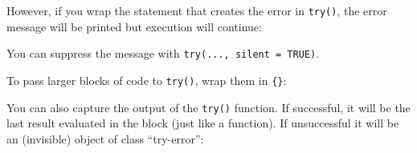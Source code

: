 \begin{Shaded}
\begin{Highlighting}[]
\StringTok{ }
\NormalTok{\}}
\NormalTok{(}\NormalTok{)}
\end{Highlighting}
\end{Shaded}

However, if you wrap the statement that creates the error in
\texttt{try()}, the error message will be printed but execution will
continue:

\begin{Shaded}
\begin{Highlighting}[]
\StringTok{ }
  \NormalTok{(}
\NormalTok{\}}
\NormalTok{(}\NormalTok{)}
\end{Highlighting}
\end{Shaded}

You can suppress the message with \texttt{try(..., silent = TRUE)}.

To pass larger blocks of code to \texttt{try()}, wrap them in
\texttt{\{\}}:

\begin{Shaded}
\begin{Highlighting}[]
\NormalTok{(\{}
  \StringTok{ }
  \StringTok{ }
\NormalTok{\})}
\end{Highlighting}
\end{Shaded}

You can also capture the output of the \texttt{try()} function. If
successful, it will be the last result evaluated in the block (just like
a function). If unsuccessful it will be an (invisible) object of class
``try-error'':

\begin{Shaded}
\begin{Highlighting}[]
\StringTok{ }\NormalTok{(} \NormalTok{+}\StringTok{ }\NormalTok{)}
\StringTok{ }\NormalTok{(} \NormalTok{+}\NormalTok{)}
\end{Highlighting}
\end{Shaded}

